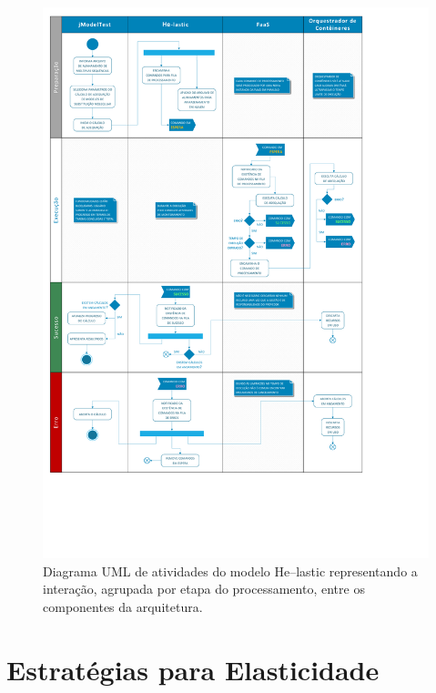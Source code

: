 \documentclass[english,brazilian]{UNISINOSmonografia} %
\begin{document}
\begin{figure}[p]
	\vspace{-15.8ex}
	\hspace{-10.1ex}
	\begin{minipage}{1.16\textwidth}
		\caption{Diagrama UML de atividades do modelo \textsf{He}--lastic representando a interação, agrupada por etapa do processamento, entre os componentes da arquitetura.}
		\label{fig:modelo-uml-activity}
		\includegraphics[trim=20 255 195 15,clip,width=\textwidth]{modelo-uml-activity}
	\end{minipage}
\end{figure}



\section{Estratégias para Elasticidade}
\label{sec:estrategias-elasticidade}
\end{document}
